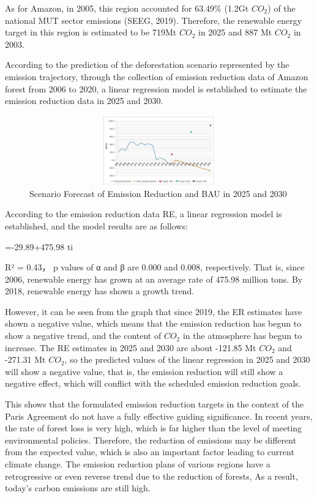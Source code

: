 \documentclass{apmcmthesis}
\begin{document}
As for Amazon, in 2005, this region accounted for 63.49$\%$ (1.2Gt $CO_2$) of the national MUT sector emissions (SEEG, 2019). Therefore, the renewable energy target in this region is estimated to be 719Mt $CO_2$ in 2025 and 887 Mt $CO_2$ in 2003.

According to the prediction of the deforestation scenario represented by the emission trajectory, through the collection of emission reduction data of Amazon forest from 2006 to 2020, a linear regression model is established to estimate the emission reduction data in 2025 and 2030.

 \begin{figure} 
    \centering
    \includegraphics[width=13cm,height=3cm]{APMCMThesis/figures/tu2.png}
    \caption{Scenario Forecast of Emission Reduction and BAU in 2025 and 2030}
\label{recuction}
\end{figure}

According to the emission reduction data RE, a linear regression model is established, and the model results are as follows:

=-29.89+475.98 ti

 R² =  0.43， p values of α and β are 0.000 and 0.008, respectively. That is, since 2006, renewable energy has grown at an average rate of 475.98 million tons. By 2018, renewable energy has shown a growth trend.


However, it can be seen from the graph that since 2019, the ER estimates have shown a negative value, which means that the emission reduction has begun to show a negative trend, and the content of $CO_2$ in the atmosphere has begun to increase. The RE estimates in 2025 and 2030 are about -121.85 Mt $CO_2$ and -271.31 Mt $CO_2$, so the predicted values of the linear regression in 2025 and 2030 will show a negative value, that is, the emission reduction will still show a negative effect, which will conflict with the scheduled emission reduction goals.

This shows that the formulated emission reduction targets in the context of the Paris Agreement do not have a fully effective guiding significance. In recent years, the rate of forest loss is very high, which is far higher than the level of meeting environmental policies. Therefore, the reduction of emissions may be different from the expected value, which is also an important factor leading to current climate change. The emission reduction plans of various regions have a retrogressive or even reverse trend due to the reduction of forests, As a result, today's carbon emissions are still high.
\end{document}
